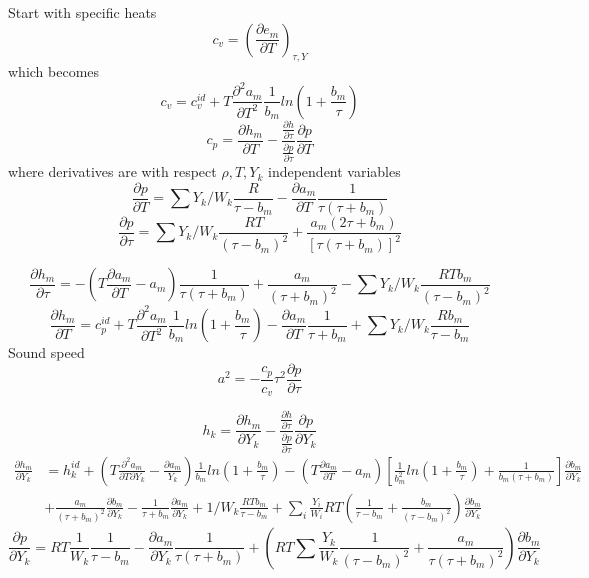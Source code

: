 \documentclass[11pt]{article}
\begin{document}
Start with specific heats
\[
c_v = \left( \frac{\partial e_m}{\partial T}\right)_{\tau,Y}
\]
which becomes
\[
c_v = c_v^{id} + T \frac{\partial^2 a_m}{\partial T^2} \frac{1}{b_m} ln ( 1 + \frac{b_m}{\tau})
\]
\[
c_p =  \frac{\partial h_m}{\partial T}
- \frac {\frac{\partial h}{\partial \tau}} 
 {\frac{\partial p}{\partial \tau}}
\frac{\partial p}{\partial T}
\]
where derivatives are with respect $\rho, T, Y_k$ independent variables
\[
\frac{\partial p}{\partial T} = \sum Y_k / W_k  \frac{R}{\tau-b_m} - \frac{\partial a_m}{\partial T} \frac{1}{\tau(\tau +b_m)}
\]
\[
\frac{\partial p}{\partial \tau} =
\sum Y_k / W_k  \frac{R T}{(\tau-b_m)^2} + \frac{a_m (2 \tau + b_m)}{[\tau(\tau +b_m)]^2}
\]

\vspace{\baselineskip}
\[
\frac{\partial h_m}{\partial \tau} =
-(T \frac{\partial a_m}{\partial T}  - a_m )
\frac{1}{\tau(\tau+b_m)}
+ \frac{a_m}{(\tau+b_m)^2}
-\sum Y_k / W_k  \frac{R T b_m}{(\tau-b_m)^2} 
\]
\vspace{\baselineskip}
\[
\frac{\partial h_m}{\partial T} = c_p^{id}
+T \frac{\partial^2 a_m}{\partial T^2} 
\frac{1}{b_m} ln ( 1 + \frac{b_m}{\tau})
- \frac{\partial a_m}{\partial T} 
\frac{1}{\tau+b_m}
+\sum Y_k / W_k  \frac{R b_m}{\tau-b_m} 
\]
Sound speed
\[
a^2 = -\frac{c_p}{c_v} \tau^2  \frac{\partial p}{\partial \tau}
\]

\[
h_k = \frac{\partial h_m}{\partial Y_k }
- \frac {\frac{\partial h}{\partial \tau}} 
 {\frac{\partial p}{\partial \tau}}
 \frac{\partial p}{\partial Y_k}
\]
\begin{align}
\frac{\partial h_m}{\partial Y_k } &=  h_k^{id}
+ (T \frac{\partial^2 a_m}{\partial T \partial Y_k}  - \frac{\partial a_m }{Y_k})
\frac{1}{b_m} ln(1+ \frac{b_m}{\tau})
-(T \frac{\partial a_m}{\partial T}  - a_m ) \left[ \frac{1}{b_m^2} ln(1+ \frac{b_m}{\tau})
+ \frac{1}{b_m(\tau+b_m)}
\right ] \frac{\partial b_m}{\partial Y_k} \nonumber \\
&+ \frac{a_m}{(\tau+b_m)^2}  \frac{\partial b_m}{\partial Y_k}
- \frac{1}{\tau+b_m}  \frac{\partial a_m}{\partial Y_k}
+ 1 / W_k  \frac{R T b_m}{\tau-b_m}+
\sum_i \frac{Y_i}{W_i} R T ( \frac{1}{\tau -b_m} + \frac{b_m}{(\tau-b_m)^2} ) \frac{ \partial b_m}{\partial Y_k} 
\end{align}
\[
 \frac{\partial p}{\partial Y_k}
= 
 R T \frac{1}{W_k} \frac{1}{\tau - b_m} - \frac{\partial a_m}{\partial Y_k} \frac{1}{\tau(\tau + b_m)}
+\left(R T \sum \frac{Y_k}{W_k} \frac{1}{(\tau - b_m)^2} + \frac{a_m}{\tau(\tau + b_m)^2} \right ) \frac{\partial b_m}{\partial Y_k}
\]
\end{document}
